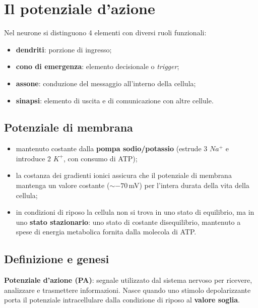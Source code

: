 \section{Il potenziale d'azione}

Nel neurone si distinguono 4 elementi con diversi ruoli funzionali:
\begin{itemize}
  \item \textbf{dendriti}: porzione di ingresso;
  \item \textbf{cono di emergenza}: elemento decisionale o \textit{trigger};
  \item \textbf{assone}: conduzione del messaggio all'interno della cellula;
  \item \textbf{sinapsi}: elemento di uscita e di comunicazione con altre cellule.
\end{itemize}

\subsection{Potenziale di membrana}

\begin{itemize}
  \item mantenuto costante dalla \textbf{pompa sodio/potassio} (estrude 3 $Na^+$ e introduce 2 $K^+$, con consumo di ATP);
  \item la costanza dei gradienti ionici assicura che il potenziale di membrana mantenga un valore costante ($\sim$$-70$\,mV) per l'intera durata della vita della cellula;
  \item in condizioni di riposo la cellula non si trova in uno stato di equilibrio, ma in uno \textbf{stato stazionario}: uno stato di costante disequilibrio, mantenuto a spese di energia metabolica fornita dalla molecola di ATP.
\end{itemize}

\subsection{Definizione e genesi}

\textbf{Potenziale d'azione (PA)}: segnale utilizzato dal sistema nervoso per ricevere, analizzare e trasmettere informazioni. Nasce quando uno stimolo depolarizzante porta il potenziale intracellulare dalla condizione di riposo al \textbf{valore soglia}.

